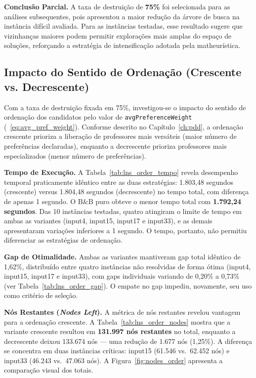 



\textbf{Conclusão Parcial.} A taxa de destruição de \textbf{75\%} foi selecionada para as análises subsequentes, pois apresentou a maior redução da árvore de busca na instância difícil avaliada. Para as instâncias testadas, esse resultado sugere que vizinhanças maiores podem permitir explorações mais amplas do espaço de soluções, reforçando a estratégia de intensificação adotada pela matheurística.

\subsection{Impacto do Sentido de Ordenação (Crescente vs. Decrescente)}

Com a taxa de destruição fixada em 75\%, investigou-se o impacto do sentido de ordenação dos candidatos pelo valor de \texttt{avgPreferenceWeight} (~\eqref{eq:avg_pref_weight}). Conforme descrito no Capítulo~\ref{ch:pdd}, a ordenação crescente prioriza a liberação de professores mais versáteis (maior número de preferências declaradas), enquanto a decrescente prioriza professores mais especializados (menor número de preferências).

\textbf{Tempo de Execução.} A Tabela~\ref{tab:lns_order_tempo} revela desempenho temporal praticamente idêntico entre as duas estratégias: 1.803,48 segundos (crescente) versus 1.804,48 segundos (decrescente) no tempo total, com diferença de apenas 1 segundo. O B\&B puro obteve o menor tempo total com \textbf{1.792,24 segundos}. Das 10 instâncias testadas, quatro atingiram o limite de tempo em ambas as variantes (input4, input15, input17 e input33), e as demais apresentaram variações inferiores a 1 segundo. O tempo, portanto, não permitiu diferenciar as estratégias de ordenação.



\textbf{Gap de Otimalidade.} Ambas as variantes mantiveram gap total idêntico de 1,62\%, distribuído entre quatro instâncias não resolvidas de forma ótima (input4, input15, input17 e input33), com gaps individuais variando de 0,20\% a 0,73\% (ver Tabela~\ref{tab:lns_order_gap}). O empate no gap impediu, novamente, seu uso como critério de seleção.



\textbf{Nós Restantes (\emph{Nodes Left}).} A métrica de nós restantes revelou vantagem para a ordenação crescente. A Tabela~\ref{tab:lns_order_nodes} mostra que a variante crescente resultou em \textbf{131.997 nós restantes} no total, enquanto a decrescente deixou 133.674 nós --- uma redução de 1.677 nós (1,25\%). A diferença se concentra em duas instâncias críticas: input15 (61.546 vs.\ 62.452 nós) e input33 (46.243 vs.\ 47.063 nós). A Figura~\ref{fig:nodes_order} apresenta a comparação visual dos totais.

